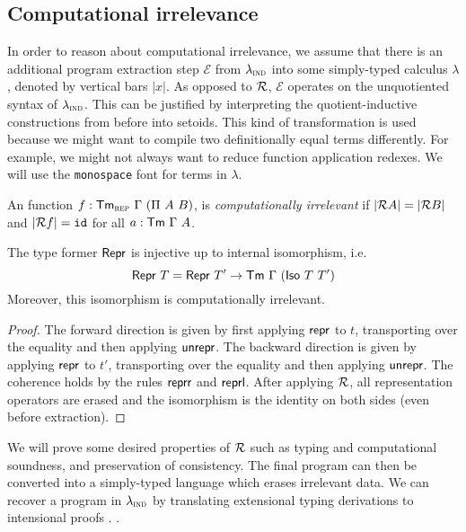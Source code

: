 \subsection{Computational irrelevance}

In order to reason about computational irrelevance, we assume that there is
an additional program extraction step $\mathcal{E}$ from $\lambda_{\textsc{ind}}$ into some
simply-typed calculus $\lambda$, denoted by vertical bars $|x|$. As opposed to
$\mathcal{R}$, $\mathcal{E}$ operates on the unquotiented syntax of $\lambda_{\textsc{ind}}$. This
can be justified by interpreting the quotient-inductive constructions from
before into setoids. This kind of
transformation is used because we might want to compile two definitionally equal
terms differently. For example, we might not always want to reduce function
application redexes. We will use the \texttt{monospace} font for terms in
$\lambda$.

\begin{definition}
    An function $f : \mta{Tm}_\rep\ \Gamma\ (\Pi\ A\ B)$, is \emph{computationally irrelevant} if
    $|\mathcal{R} A| = |\mathcal{R} B|$ and $|\mathcal{R} f| = \texttt{id}$ for all $a : \textsf{Tm}\ \Gamma\ A$.
\end{definition}

\begin{lemma}
	The type former $\textsf{Repr}{}$ is injective up to internal isomorphism, i.e.
	\begin{equation}
	\mta{Repr}\ T = \mta{Repr}\ T' \to \Tm\ \Gamma\ (\mta{Iso}\ T\ T')
	\end{equation}
	Moreover, this isomorphism is computationally irrelevant.
	\begin{proof}
	The forward direction is given by first applying $\textsf{repr}$ to $t$,
	transporting over the equality and then applying $\textsf{unrepr}$. The
	backward direction is given by applying $\textsf{repr}$ to $t'$, transporting
	over the equality and then applying $\textsf{unrepr}$. The coherence holds by
	the rules $\textsf{reprr}$ and $\textsf{reprl}$. After applying $\mathcal{R}$, all
	representation operators are erased and the isomorphism is the identity on both
	sides (even before extraction).
	\end{proof}
\end{lemma}


We will prove some desired properties
of $\mathcal{R}$ \cite{Boulier2017-cm} such as typing and computational soundness, and
preservation of consistency. The final program can then be converted into a
simply-typed language which erases irrelevant data. We can recover a program in
$\lambda_{\textsc{ind}}$ by translating extensional typing derivations to intensional proofs
\cite{Winterhalter2019-zw}.
\cite{Winterhalter2019-zw}.
